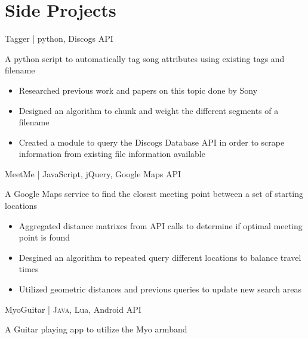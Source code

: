 \documentclass[10pt]{article} %
\begin{document}
{\begin{minipage}[t]{0.34\textwidth}

\section{Side Projects}

\vspace{6pt}


{\raggedright\large Tagger \small\color{darkgray} | python, Discogs API \\ [5pt]}
A python script to automatically tag song attributes using existing tags and filename
\begin{itemize}[noitemsep, nosep, leftmargin=.5cm]
  \item {Researched previous work and papers on this topic done by Sony }
  \item {Designed an algorithm to chunk and weight the different segments of a filename}
  \item {Created a module to query the Discogs Database API in order to scrape information from existing file information available}

\end{itemize}

\vspace{10pt}

{\raggedright\large MeetMe \small\color{darkgray} | JavaScript, jQuery, Google Maps API\\ [5pt]}
A Google Maps service to find the closest meeting point between a set of starting locations
\begin{itemize}[noitemsep, nosep, leftmargin=.5cm]
  \item {Aggregated distance matrixes from API calls to determine if optimal meeting point is found}
  \item {Desgined an algorithm to repeated query different locations to balance travel times}
  \item {Utilized geometric distances and previous queries to update new search areas}

\end{itemize}
\vspace{10pt}

{\raggedright\large MyoGuitar \small\color{darkgray} | \textsc{Java}, Lua, Android API\\ [5pt]}

A Guitar playing app to utilize the Myo armband


\end{minipage}}
\end{document}
